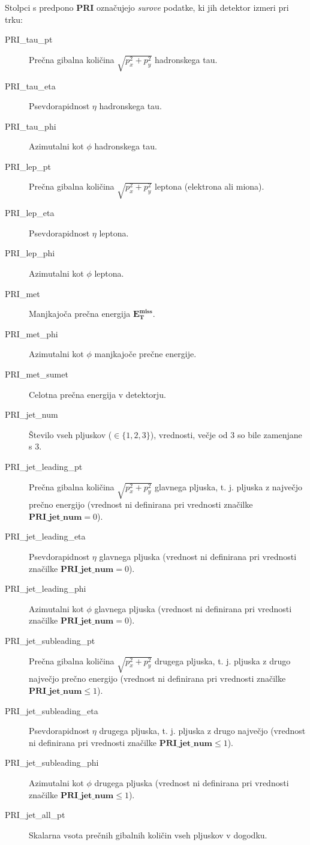 \documentclass[11pt,a4paper,openany]{book}
\begin{document}
\noindent Stolpci s predpono \textbf{PRI} označujejo \textit{surove} podatke, ki jih detektor izmeri pri trku:
\begin{changemargin}{0.5cm}{0.0cm} 
\begin{description}
	\item[PRI\_tau\_pt] Prečna gibalna količina $\sqrt{p_x^2 + p_y^2}$ hadronskega tau.
	\item[PRI\_tau\_eta] Psevdorapidnost $\eta$ hadronskega tau.
	\item[PRI\_tau\_phi] Azimutalni kot $\phi$ hadronskega tau.
	
	\item[PRI\_lep\_pt] Prečna gibalna količina $\sqrt{p_x^2 + p_y^2}$ leptona (elektrona ali miona).
	\item[PRI\_lep\_eta] Psevdorapidnost $\eta$ leptona.
	\item[PRI\_lep\_phi] Azimutalni kot $\phi$ leptona.
	
	\item[PRI\_met] Manjkajoča prečna energija $\mathbf{E_T^{\text{miss}}}$.
	\item[PRI\_met\_phi] Azimutalni kot $\phi$ manjkajoče prečne energije.
	
	\item[PRI\_met\_sumet] Celotna prečna energija v detektorju.
	
	\item[PRI\_jet\_num] Število vseh pljuskov ($\in \{1, 2, 3\}$), vrednosti, večje od $3$ so bile zamenjane s 3.
	
	\item[PRI\_jet\_leading\_pt] Prečna gibalna količina $\sqrt{p_x^2 + p_y^2}$ glavnega pljuska, t. j. pljuska z največjo prečno energijo (vrednost ni definirana pri vrednosti značilke $\textbf{PRI\_jet\_num} = 0$).
	\item[PRI\_jet\_leading\_eta] Psevdorapidnost $\eta$ glavnega pljuska (vrednost ni definirana pri vrednosti značilke $\textbf{PRI\_jet\_num} = 0$).
	\item[PRI\_jet\_leading\_phi] Azimutalni kot $\phi$ glavnega pljuska (vrednost ni definirana pri vrednosti značilke $\textbf{PRI\_jet\_num} = 0$).
	
	\item[PRI\_jet\_subleading\_pt] Prečna gibalna količina $\sqrt{p_x^2 + p_y^2}$ drugega pljuska, t. j. pljuska z drugo največjo prečno energijo (vrednost ni definirana pri vrednosti značilke $\textbf{PRI\_jet\_num} \le 1$).
	\item[PRI\_jet\_subleading\_eta] Psevdorapidnost $\eta$ drugega pljuska, t. j. pljuska z drugo največjo (vrednost ni definirana pri vrednosti značilke $\textbf{PRI\_jet\_num} \le 1$).
	\item[PRI\_jet\_subleading\_phi] Azimutalni kot $\phi$ drugega pljuska (vrednost ni definirana pri vrednosti značilke $\textbf{PRI\_jet\_num} \le 1$).
	
	\item[PRI\_jet\_all\_pt] Skalarna vsota prečnih gibalnih količin vseh pljuskov v dogodku.
\end{description}
\end{changemargin}
\end{document}
